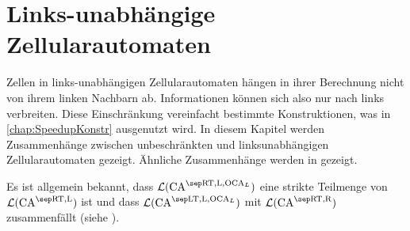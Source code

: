 \chapter{Links-unabhängige Zellularautomaten}
\label{chap:LinksunabhAuto}

Zellen in links-unabhängigen Zellularautomaten hängen in ihrer Berechnung nicht von ihrem linken Nachbarn ab.
Informationen können sich also nur nach links verbreiten. Diese Einschränkung vereinfacht bestimmte Konstruktionen, was in \cref{chap:SpeedupKonstr} ausgenutzt wird.
In diesem Kapitel werden Zusammenhänge zwischen unbeschränkten und linksunabhängigen Zellularautomaten gezeigt.
Ähnliche Zusammenhänge werden in \cite{Choffrut1984} gezeigt.

Es ist allgemein bekannt,
dass $\CAL{\CART, \CALeft, \LOCA}$ eine strikte Teilmenge von $\CAL{\CART, \CALeft}$ ist und
dass $\CAL{\CALT, \CALeft, \LOCA}$ mit $\CAL{\CART, \CARight}$ zusammenfällt (siehe \cite{Kutrib2009}).

